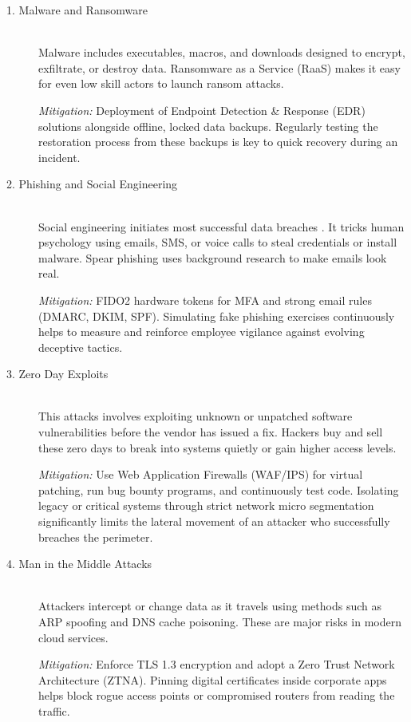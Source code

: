 \begin{description}
    \item[1. Malware and Ransomware] \hfill \\
    Malware includes executables, macros, and downloads designed to encrypt, exfiltrate, or destroy data. Ransomware as a Service (RaaS) makes it easy for even low skill actors to launch ransom attacks.
    
    \textit{Mitigation:} Deployment of Endpoint Detection \& Response (EDR) solutions alongside offline, locked data backups. Regularly testing the restoration process from these backups is key to quick recovery during an incident.

    \item[2. Phishing and Social Engineering] \hfill \\
    Social engineering initiates most successful data breaches \cite{verizon_dbir_2023}. It tricks human psychology using emails, SMS, or voice calls to steal credentials or install malware. Spear phishing uses background research to make emails look real.
    
    \textit{Mitigation:} FIDO2 hardware tokens for MFA and strong email rules (DMARC, DKIM, SPF). Simulating fake phishing exercises continuously helps to measure and reinforce employee vigilance against evolving deceptive tactics.

    \item[3. Zero Day Exploits] \hfill \\
    This attacks involves exploiting unknown or unpatched software vulnerabilities before the vendor has issued a fix. Hackers buy and sell these zero days to break into systems quietly or gain higher access levels.
    
    \textit{Mitigation:} Use Web Application Firewalls (WAF/IPS) for virtual patching, run bug bounty programs, and continuously test code. Isolating legacy or critical systems through strict network micro segmentation significantly limits the lateral movement of an attacker who successfully breaches the perimeter.

    \item[4. Man in the Middle Attacks] \hfill \\
    Attackers intercept or change data as it travels using methods such as ARP spoofing and DNS cache poisoning. These are major risks in modern cloud services.
    
    \textit{Mitigation:} Enforce TLS 1.3 encryption and adopt a Zero Trust Network Architecture (ZTNA). Pinning digital certificates inside corporate apps helps block rogue access points or compromised routers from reading the traffic.


\end{description}

